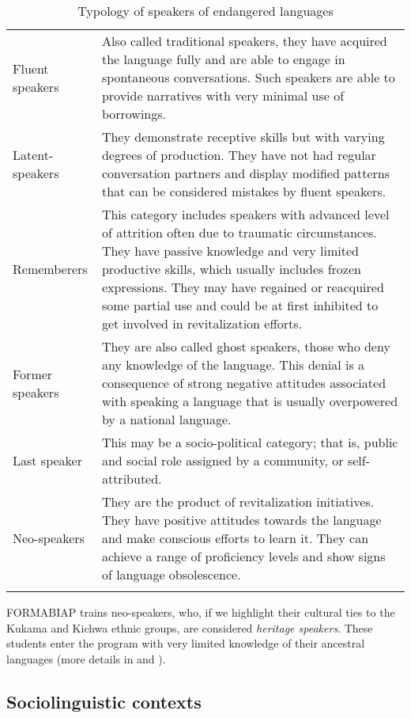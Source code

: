 \documentclass[output=paper]{langscibook}
\begin{document}
\begin{table}[t]
\caption{Typology of speakers of endangered languages \citep[147]{Vallejos2016b}}
\label{tab:7:1}

\begin{tabularx}{\textwidth}{lQ}
\lsptoprule
Fluent speakers & Also called traditional speakers, they have acquired the language fully and are able to engage in spontaneous conversations. Such speakers are able to provide narratives with very minimal use of borrowings.\\
\tablevspace
Latent-speakers & They demonstrate receptive skills but with varying degrees of production. They have not had regular conversation partners and display modified patterns that can be considered mistakes by fluent speakers.\\
\tablevspace
Rememberers & This category includes speakers with advanced level of attrition often due to traumatic circumstances. They have passive knowledge and very limited productive skills, which usually includes frozen expressions. They may have regained or reacquired some partial use and could be at first inhibited to get involved in revitalization efforts.\\
\tablevspace
Former speakers & They are also called ghost speakers, those who deny any knowledge of the language. This denial is a consequence of strong negative attitudes associated with speaking a language that is usually overpowered by a national language.\\
\tablevspace
Last speaker & This may be a socio-political category; that is, public and social role assigned by a community, or self-attributed. \\
\tablevspace
Neo-speakers & They are the product of revitalization initiatives. They have positive attitudes towards the language and make conscious efforts to learn it. They can achieve a range of proficiency levels and show signs of language obsolescence. \\
\lspbottomrule
\end{tabularx}
\end{table}

FORMABIAP trains neo-speakers, who, if we highlight their cultural ties to the Kukama and Kichwa ethnic groups, are considered \textit{heritage speakers}. These students enter the program with very limited knowledge of their ancestral languages (more details in  and ).

\subsection{Sociolinguistic contexts}\label{sec:7:2.4}
\end{document}
